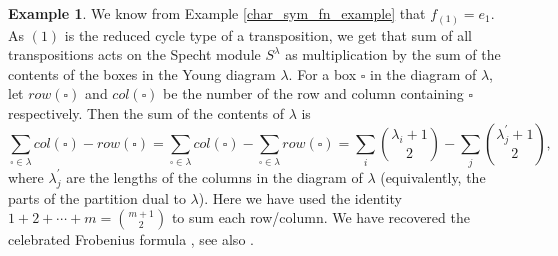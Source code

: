\documentclass[10pt]{article}
\theoremstyle{definition}
\newtheorem{example}[theorem]{Example}
\begin{document}
\begin{example}
We know from Example \ref{char_sym_fn_example} that $f_{(1)} = e_1$. As $(1)$ is the reduced cycle type of a transposition, we get that sum of all transpositions acts on the Specht module $S^\lambda$ as multiplication by the sum of the contents of the boxes in the Young diagram $\lambda$. For a box $\square$ in the diagram of $\lambda$, let $row(\square)$ and $col(\square)$ be the number of the row and column containing $\square$ respectively. Then the sum of the contents of $\lambda$ is
\[
\sum_{\square \in \lambda} col(\square) - row(\square) = \sum_{\square \in \lambda} col(\square) - \sum_{\square \in \lambda} row(\square) = \sum_i \binom{\lambda_i +1}{2} - \sum_{j} \binom{\lambda_j^\prime +1}{2},
\]
where $\lambda_j^\prime$ are the lengths of the columns in the diagram of $\lambda$ (equivalently, the parts of the partition dual to $\lambda$). Here we have used the identity $1 + 2 + \cdots + m = \binom{m +1}{2}$ to sum each row/column. We have recovered the celebrated Frobenius formula \cite{Frobenius}, see also \cite[Example 7, Section 1.7]{Macdonald}. 
\end{example}
\end{document}
